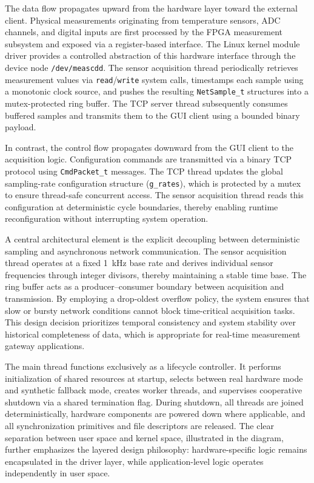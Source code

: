 The data flow propagates upward from the hardware layer toward the external client. Physical measurements originating from temperature sensors, ADC channels, and digital inputs are first processed by the FPGA measurement subsystem and exposed via a register-based interface. The Linux kernel module driver provides a controlled abstraction of this hardware interface through the device node \texttt{/dev/meascdd}. The sensor acquisition thread periodically retrieves measurement values via \texttt{read}/\texttt{write} system calls, timestamps each sample using a monotonic clock source, and pushes the resulting \texttt{NetSample\_t} structures into a mutex-protected ring buffer. The TCP server thread subsequently consumes buffered samples and transmits them to the GUI client using a bounded binary payload.

In contrast, the control flow propagates downward from the GUI client to the acquisition logic. Configuration commands are transmitted via a binary TCP protocol using \texttt{CmdPacket\_t} messages. The TCP thread updates the global sampling-rate configuration structure (\texttt{g\_rates}), which is protected by a mutex to ensure thread-safe concurrent access. The sensor acquisition thread reads this configuration at deterministic cycle boundaries, thereby enabling runtime reconfiguration without interrupting system operation.

A central architectural element is the explicit decoupling between deterministic sampling and asynchronous network communication. The sensor acquisition thread operates at a fixed 1~kHz base rate and derives individual sensor frequencies through integer divisors, thereby maintaining a stable time base. The ring buffer acts as a producer--consumer boundary between acquisition and transmission. By employing a drop-oldest overflow policy, the system ensures that slow or bursty network conditions cannot block time-critical acquisition tasks. This design decision prioritizes temporal consistency and system stability over historical completeness of data, which is appropriate for real-time measurement gateway applications.

The main thread functions exclusively as a lifecycle controller. It performs initialization of shared resources at startup, selects between real hardware mode and synthetic fallback mode, creates worker threads, and supervises cooperative shutdown via a shared termination flag. During shutdown, all threads are joined deterministically, hardware components are powered down where applicable, and all synchronization primitives and file descriptors are released. The clear separation between user space and kernel space, illustrated in the diagram, further emphasizes the layered design philosophy: hardware-specific logic remains encapsulated in the driver layer, while application-level logic operates independently in user space.


